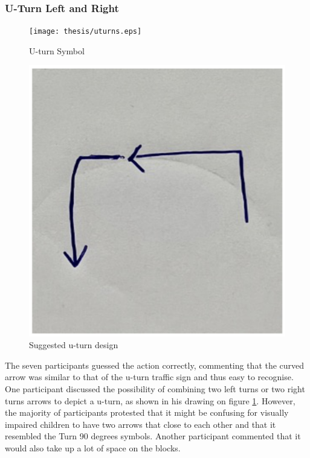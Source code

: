 \documentclass[oneside,%
                    author={Malak Hajji},
                    degree={BSc},
                    title={Designing An Accessible Computational Toolkit For Students},
                  subtitle={With Mixed Visual Abilities}]{dissertation}
\begin{document}
\subsubsection{U-Turn Left and Right}
\FloatBarrier
\begin{figure}[h]
\centering
\begin{minipage}{.5\textwidth}
  \centering
  \texttt{[image: thesis/uturns.eps]}
  \caption{U-turn Symbol}
  \label{fig:initial-turn}
\end{minipage}%
\begin{minipage}{.5\textwidth}
  \centering
  \includegraphics[width=.5\textwidth]{thesis/uturn.eps}
  \caption{Suggested u-turn design}
  \label{fig:suggested-turn}
\end{minipage}
\end{figure}
\FloatBarrier
The seven participants guessed the action correctly, commenting that the curved arrow was similar to that of the u-turn traffic sign and thus easy to recognise. One participant discussed the possibility of combining two left turns or two right turns arrows to depict a u-turn, as shown in his drawing on figure \ref{fig:suggested-turn}. However, the majority of participants protested that it might be confusing for visually impaired children to have two arrows that close to each other and that it resembled the Turn 90 degrees symbols. Another participant commented that it would also take up a lot of space on the blocks.
\end{document}

